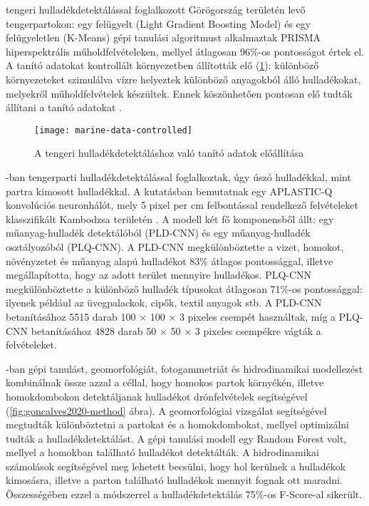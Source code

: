 \cite{Taggio2022} tengeri hulladékdetektálással foglalkozott Görögország területén levő tengerpartokon: egy felügyelt (Light Gradient Boosting Model) és egy felügyeletlen (K-Means) gépi tanulási algoritmust alkalmaztak PRISMA hiperspektrális műholdfelvételeken, mellyel átlagosan 96\%-os pontosságot értek el. A tanító adatokat kontrollált környezetben állították elő (\ref{fig:marine-data-controlled}): különböző környezeteket szimulálva vízre helyeztek különböző anyagokból álló hulladékokat, melyekről műholdfelvételek készültek. Ennek köszönhetően pontosan elő tudták állítani a tanító adatokat .

\begin{figure}[H]
	\centering
	\texttt{[image: marine-data-controlled]}
	\caption{A tengeri hulladékdetektáláshoz való tanító adatok előállítása \cite{Taggio2022}}
    \label{fig:marine-data-controlled}
\end{figure}

\cite{Wolf2020}-ban tengerparti hulladékdetektálással foglalkoztak, úgy úszó hulladékkal, mint partra kimosott hulladékkal. A kutatásban bemutatnak egy APLASTIC-Q konvolúciós neuronhálót, mely 5 pixel per cm felbontással rendelkező felvételeket klasszifikált Kambodzsa területén . A modell két fő komponensből állt: egy műanyag-hulladék detektálóból (PLD-CNN) és egy műanyag-hulladék osztályozóból (PLQ-CNN). A PLD-CNN megkülönböztette a vizet, homokot, növényzetet és műanyag alapú hulladékot 83\% átlagos pontossággal, illetve megállapította, hogy az adott terület mennyire hulladékos. PLQ-CNN megkülönböztette a különböző hulladék típusokat átlagosan 71\%-os pontossággal: ilyenek például az üvegpalackok, cipők, textil anyagok stb. A PLD-CNN betanításához 5515 darab 100 × 100 × 3 pixeles csempét használtak, míg a PLQ-CNN betanításához 4828 darab 50 × 50 × 3 pixeles csempékre vágták a felvételeket. 

\cite{Goncalves2020}-ban gépi tanulást, geomorfológiát, fotogammetriát és hidrodinamikai modellezést kombinálnak össze azzal a céllal, hogy homokos partok környékén, illetve homokdombokon detektáljanak hulladékot drónfelvételek segítségével (\ref{fig:goncalves2020-method} ábra). A geomorfológiai vizsgálat segítségével megtudták különböztetni a partokat és a homokdombokat, mellyel optimizálni tudták a hulladékdetektálást. A gépi tanulási modell egy Random Forest volt, mellyel a homokban található hulladékot detektálták. A hidrodinamikai számolások segítségével meg lehetett becsülni, hogy hol kerülnek a hulladékok kimosásra, illetve a parton található hulladékok mennyit fognak ott maradni. Összességében ezzel a módszerrel a hulladékdetektálás 75\%-os F-Score-al sikerült.

